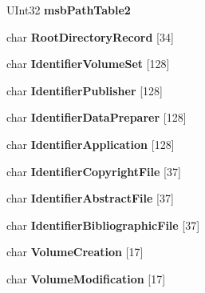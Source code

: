 \begin{DoxyCompactItemize}
U\+Int32 {\bfseries msb\+Path\+Table2}
\item 
\mbox{\label{struct____attribute_____a07f16dbdf8ad13bbe8e5f2e6c60ea3ba}} 
char {\bfseries Root\+Directory\+Record} \mbox{[}34\mbox{]}
\item 
\mbox{\label{struct____attribute_____aa41cd98810e415cffb3b144d10e2308b}} 
char {\bfseries Identifier\+Volume\+Set} \mbox{[}128\mbox{]}
\item 
\mbox{\label{struct____attribute_____aac00e71248849ec2985695355031a9a6}} 
char {\bfseries Identifier\+Publisher} \mbox{[}128\mbox{]}
\item 
\mbox{\label{struct____attribute_____a36a320b9af3d6441df4219221e7df643}} 
char {\bfseries Identifier\+Data\+Preparer} \mbox{[}128\mbox{]}
\item 
\mbox{\label{struct____attribute_____a8e43c88141ea1bd6469382d2bf866667}} 
char {\bfseries Identifier\+Application} \mbox{[}128\mbox{]}
\item 
\mbox{\label{struct____attribute_____a990e7dffc2d65c2eeef6ce2a76ef115d}} 
char {\bfseries Identifier\+Copyright\+File} \mbox{[}37\mbox{]}
\item 
\mbox{\label{struct____attribute_____a050a4b48c5bd916473850746f9e32e73}} 
char {\bfseries Identifier\+Abstract\+File} \mbox{[}37\mbox{]}
\item 
\mbox{\label{struct____attribute_____a3bc0ec0ae298a9674445dcf207c2e0fe}} 
char {\bfseries Identifier\+Bibliographic\+File} \mbox{[}37\mbox{]}
\item 
\mbox{\label{struct____attribute_____aa32bd40413a44de8e0e7bae7b170f9d7}} 
char {\bfseries Volume\+Creation} \mbox{[}17\mbox{]}
\item 
\mbox{\label{struct____attribute_____a82995d706356ac5804ab2a6c1e955cc2}} 
char {\bfseries Volume\+Modification} \mbox{[}17\mbox{]}
\item 

\end{DoxyCompactItemize}
